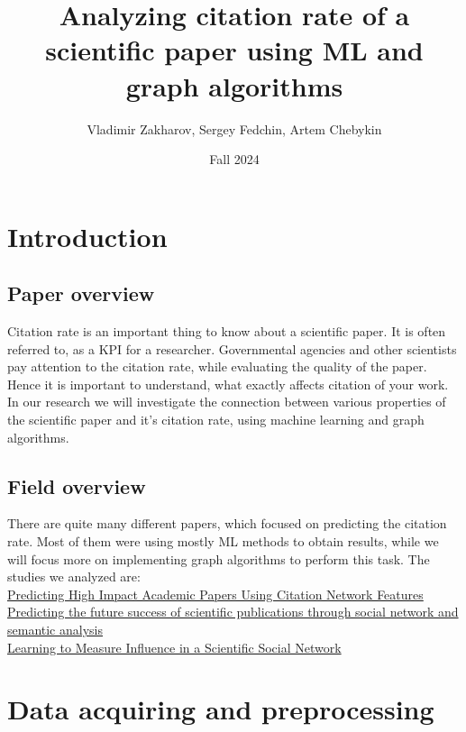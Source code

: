 \documentclass{article}
\title{Analyzing citation rate of a scientific paper using ML and graph algorithms}
\author{Vladimir Zakharov, Sergey Fedchin, Artem Chebykin}
\date{Fall 2024}
\newcommand\tab[1][1cm]{\hspace*{#1}}
\begin{document}
\maketitle

\section{Introduction}

\subsection{Paper overview}

\tab Citation rate is an important thing to know about a scientific paper. It is often referred to, as a KPI for a researcher. Governmental agencies and other scientists pay attention to the citation rate, while evaluating the quality of the paper. Hence it is important to understand, what exactly affects citation of your work. In our research we will investigate the connection between various properties of the scientific paper and it's citation rate, using machine learning and graph algorithms. \\

\subsection{Field overview}
\tab There are quite many different papers, which focused on predicting the citation rate. Most of them were using mostly ML methods to obtain results, while we will focus more on implementing graph algorithms to perform this task. The studies we analyzed are: \\

\href{https://link.springer.com/chapter/10.1007/978-3-642-40319-4_2?fromPaywallRec=false}{Predicting High Impact Academic Papers Using Citation Network Features} \\

\href{https://link.springer.com/article/10.1007/s11192-020-03479-5?fromPaywallRec=true}{Predicting the future success of scientific publications through social network and semantic analysis} \\

 \href{https://link.springer.com/chapter/10.1007/978-3-319-06483-3_4?fromPaywallRec=true}{Learning to Measure Influence in a Scientific Social Network} \\
\section{Data acquiring and preprocessing}
\end{document}
